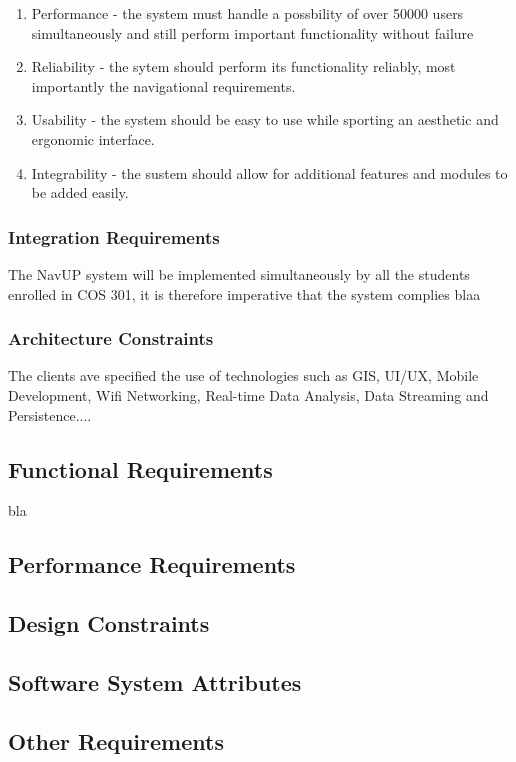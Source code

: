 \documentclass[12pt,a4paper]{report}
\begin{document}
				\begin{enumerate}
				\renewcommand{\labelenumi}{{\textbf{\arabic{enumi}.}}}
				\item Performance - the system must handle a possbility of over 50000 users simultaneously and still perform important functionality without failure
				\item Reliability - the sytem should perform its functionality reliably, most importantly the navigational requirements.
				\item Usability - the system should be easy to use while sporting an aesthetic and ergonomic interface.
				\item Integrability - the sustem should allow for additional features and modules to be added easily.
				\end{enumerate}
				
			\subsubsection{Integration Requirements}
				The NavUP system will be implemented simultaneously by all the students enrolled in COS 301, it is therefore imperative that the system complies blaa %
			\subsubsection{Architecture Constraints}
				The clients ave specified the use of technologies such as GIS, UI/UX, Mobile Development, Wifi Networking, Real-time Data Analysis, Data Streaming and
				Persistence....
		
	\subsection*{Functional Requirements}
		bla
		
	\subsection*{Performance Requirements}
	\subsection*{Design Constraints}
	\subsection*{Software System Attributes}
    \subsection*{Other Requirements}
\end{document}

